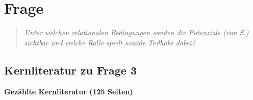 \documentclass[ngerman, a4paper]{article}
\begin{document}
\section{Frage}
\label{sec:frage3}
 
\begin{quote}\itshape
Unter welchen relationalen Bedingungen werden
die Potenziale (von S.) sichtbar und welche Rolle spielt soziale
Teilhabe dabei?
\end{quote}

\subsection{Kernliteratur zu Frage 3}
 
\textbf{Gezählte Kernliteratur (125 Seiten)}
\end{document}
